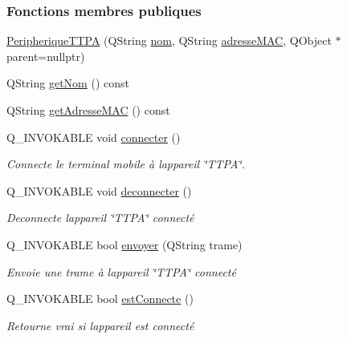 \subsubsection*{Fonctions membres publiques}
\begin{DoxyCompactItemize}
\item 
\hyperlink{class_peripherique_t_t_p_a_acb4f39a3af94d61dcb673df11bed3a15}{Peripherique\+T\+T\+PA} (Q\+String \hyperlink{class_peripherique_t_t_p_a_afafe3566b4b5357819811218b9a4244f}{nom}, Q\+String \hyperlink{class_peripherique_t_t_p_a_a444063230c83cf81eff8a3a55736f2cf}{adresse\+M\+AC}, Q\+Object $\ast$parent=nullptr)
\item 
Q\+String \hyperlink{class_peripherique_t_t_p_a_abb04680791a7e778ac3808b5d218421f}{get\+Nom} () const
\item 
Q\+String \hyperlink{class_peripherique_t_t_p_a_a1e828514b4576a87295bb2d9a3d87876}{get\+Adresse\+M\+AC} () const
\item 
Q\+\_\+\+I\+N\+V\+O\+K\+A\+B\+LE void \hyperlink{class_peripherique_t_t_p_a_a8afa92f7c3ae6e1edc30f5c8b386af81}{connecter} ()
\begin{DoxyCompactList}\small\item\em Connecte le terminal mobile à l\textquotesingle{}appareil \char`\"{}\+T\+T\+P\+A\char`\"{}. \end{DoxyCompactList}\item 
Q\+\_\+\+I\+N\+V\+O\+K\+A\+B\+LE void \hyperlink{class_peripherique_t_t_p_a_a23bd4f409e6763022807d5b278464328}{deconnecter} ()
\begin{DoxyCompactList}\small\item\em Deconnecte l\textquotesingle{}appareil \char`\"{}\+T\+T\+P\+A\char`\"{} connecté \end{DoxyCompactList}\item 
Q\+\_\+\+I\+N\+V\+O\+K\+A\+B\+LE bool \hyperlink{class_peripherique_t_t_p_a_a529048ac8be73560038bbeee0047b634}{envoyer} (Q\+String trame)
\begin{DoxyCompactList}\small\item\em Envoie une trame à l\textquotesingle{}appareil \char`\"{}\+T\+T\+P\+A\char`\"{} connecté \end{DoxyCompactList}\item 
Q\+\_\+\+I\+N\+V\+O\+K\+A\+B\+LE bool \hyperlink{class_peripherique_t_t_p_a_a33991b646ef2a49e79bac478b5f722c7}{est\+Connecte} ()
\begin{DoxyCompactList}\small\item\em Retourne vrai si l\textquotesingle{}appareil est connecté \end{DoxyCompactList}\end{DoxyCompactItemize}
